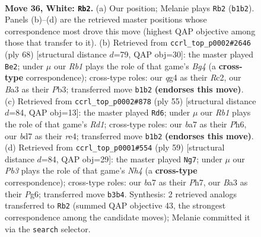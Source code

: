 \documentclass[11pt]{article}
\begin{document}
\begin{figure}[p]\centering
\begin{subfigure}{0.46\textwidth}\centering
\resizebox{\linewidth}{!}{%
\newchessgame
\chessboard[
  setfen={r2r3k/bp1b1Q2/p3p2p/8/6q1/BP1p4/P4P1P/1R2RK2 w - - 0 36},
  showmover=false,
  pgfstyle=straightmove, color=movearrow, markmove={b1-b2}
]}
\caption{}
\end{subfigure}\hfill
\begin{subfigure}{0.46\textwidth}\centering
\resizebox{\linewidth}{!}{%
\newchessgame
\chessboard[
  setfen={1b1rrk2/5p1Q/5qp1/1p6/6B1/1P2P3/P1R2Pp1/2R3K1 w - - 0 35},
  showmover=false,
  pgfstyle=straightmove, color=movearrow, markmove={g4-e2}
]}
\caption{}
\end{subfigure}
\\[4pt]
\begin{subfigure}{0.46\textwidth}\centering
\resizebox{\linewidth}{!}{%
\newchessgame
\chessboard[
  setfen={3r1r1k/5pp1/pp5p/5q2/4R2P/4Q3/PP3PP1/2R3K1 b - - 1 28},
  showmover=false,
  pgfstyle=straightmove, color=movearrow, markmove={d8-d6}
]}
\caption{}
\end{subfigure}\hfill
\begin{subfigure}{0.46\textwidth}\centering
\resizebox{\linewidth}{!}{%
\newchessgame
\chessboard[
  setfen={r1r3k1/p4p1p/3Q2p1/q6n/8/P3BP2/6PP/3RR1K1 b - - 0 30},
  showmover=false,
  pgfstyle=straightmove, color=movearrow, markmove={h5-g7}
]}
\caption{}
\end{subfigure}
\caption{\textbf{Move 36, White: \texttt{Rb2}.} (a) Our position; Melanie plays \texttt{Rb2} (\texttt{b1b2}). Panels (b)--(d) are the retrieved master positions whose correspondence most drove this move (highest QAP objective among those that transfer to it). (b) Retrieved from \texttt{ccrl\_top\_p0002\#2646} (ply 68) [structural distance $d$=79, QAP obj=30]: the master played \texttt{Be2}; under $\mu$ our \emph{Rb1} plays the role of that game's \emph{Bg4} (a \textbf{cross-type} correspondence); cross-type roles: our \emph{q}g4 as their \emph{R}c2, our \emph{B}a3 as their \emph{P}b3; transferred move \texttt{b1b2} \textbf{(endorses this move)}. (c) Retrieved from \texttt{ccrl\_top\_p0002\#878} (ply 55) [structural distance $d$=84, QAP obj=13]: the master played \texttt{Rd6}; under $\mu$ our \emph{Rb1} plays the role of that game's \emph{Rd1}; cross-type roles: our \emph{b}a7 as their \emph{P}h6, our \emph{b}d7 as their \emph{r}e4; transferred move \texttt{b1b2} \textbf{(endorses this move)}. (d) Retrieved from \texttt{ccrl\_top\_p0001\#554} (ply 59) [structural distance $d$=84, QAP obj=29]: the master played \texttt{Ng7}; under $\mu$ our \emph{Pb3} plays the role of that game's \emph{Nh4} (a \textbf{cross-type} correspondence); cross-type roles: our \emph{b}a7 as their \emph{P}h7, our \emph{B}a3 as their \emph{P}g6; transferred move \texttt{b3b4}. Synthesis: 2 retrieved analogs transferred to \texttt{Rb2} (summed QAP objective 43, the strongest correspondence among the candidate moves); Melanie committed it via the \texttt{search} selector.}
\label{fig:thought-m70}
\end{figure}
\end{document}
